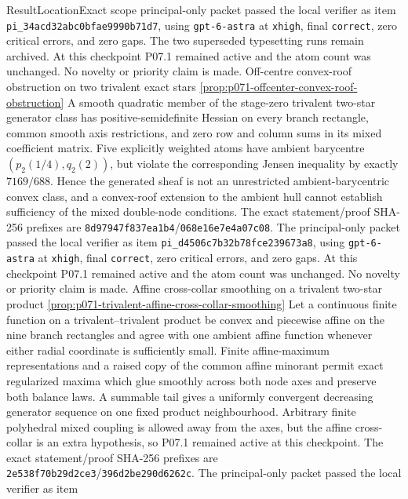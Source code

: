 \begin{AppLProvenanceLedger}{Result}{Location}{Exact scope}
{   principal-only packet passed the local verifier as item
   \nolinkurl{pi_34acd32abc0bfae9990b71d7}, using
   \texttt{gpt-6-astra} at \texttt{xhigh}, final \texttt{correct}, zero
   critical errors, and zero gaps.  The two superseded typesetting runs
   remain archived. At this checkpoint P07.1 remained active and the atom count
   was unchanged.
   No novelty or priority claim is made.}
\AppLProvenanceRecord
  {Off-centre convex-roof obstruction on two trivalent exact stars}
  {\cref{prop:p071-offcenter-convex-roof-obstruction}}
  {A smooth quadratic member of the stage-zero trivalent two-star generator
   class has positive-semidefinite Hessian on every branch rectangle, common
   smooth axis restrictions, and zero row and column sums in its mixed
   coefficient matrix.  Five explicitly weighted atoms have ambient
   barycentre \((p_2(1/4),q_2(2))\), but violate the corresponding Jensen
   inequality by exactly \(7169/688\).  Hence the generated sheaf is not an
   unrestricted ambient-barycentric convex class, and a convex-roof
   extension to the ambient hull cannot establish sufficiency of the mixed
   double-node conditions.  The exact statement/proof SHA-256 prefixes are
   \texttt{8d97947f837ea1b4}/\texttt{068e16e7e4a07c08}.  The
   principal-only packet passed the local verifier as item
   \nolinkurl{pi_d4506c7b32b78fce239673a8}, using
   \texttt{gpt-6-astra} at \texttt{xhigh}, final \texttt{correct}, zero
   critical errors, and zero gaps. At this checkpoint P07.1 remained active
   and the atom count was unchanged. No novelty or priority claim is made.}
\AppLProvenanceRecord
  {Affine cross-collar smoothing on a trivalent two-star product}
  {\cref{prop:p071-trivalent-affine-cross-collar-smoothing}}
  {Let a continuous finite function on a trivalent--trivalent product be
   convex and piecewise affine on the nine branch rectangles and agree with
   one ambient affine function whenever either radial coordinate is
   sufficiently small.  Finite affine-maximum representations and a raised
   copy of the common affine minorant permit exact regularized maxima which
   glue smoothly across both node axes and preserve both balance laws.  A
   summable tail gives a uniformly convergent decreasing generator sequence
   on one fixed product neighbourhood.  Arbitrary finite polyhedral mixed
   coupling is allowed away from the axes, but the affine cross-collar is an
   extra hypothesis, so P07.1 remained active at this checkpoint. The exact
   statement/proof SHA-256 prefixes are
   \texttt{2e538f70b29d2ce3}/\texttt{396d2be290d6262c}.  The
   principal-only packet passed the local verifier as item
}
\end{AppLProvenanceLedger}

